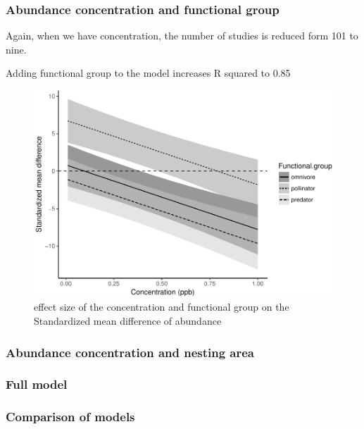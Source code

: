 \documentclass[]{elsarticle} %
\makeatletter
\def\maxwidth{\ifdim\Gin@nat@width>\linewidth\linewidth
\else\Gin@nat@width\fi}
\let\Oldincludegraphics\includegraphics
\renewcommand{\includegraphics}[1]{\Oldincludegraphics[width=\maxwidth]{#1}}
\makeatother
\begin{document}
\subsubsection{Abundance concentration and functional
group}\label{abundance-concentration-and-functional-group}

Again, when we have concentration, the number of studies is reduced form
101 to nine.

Adding functional group to the model increases R squared to 0.85

\begin{figure}[htbp]
\centering
\includegraphics{MetanalysisNeonics_files/figure-latex/unnamed-chunk-11-1.pdf}
\caption{effect size of the concentration and functional group on the
Standardized mean difference of abundance}
\end{figure}

\subsubsection{Abundance concentration and nesting
area}\label{abundance-concentration-and-nesting-area}

\subsubsection{Full model}\label{full-model}

\subsubsection{Comparison of models}\label{comparison-of-models}
\end{document}
